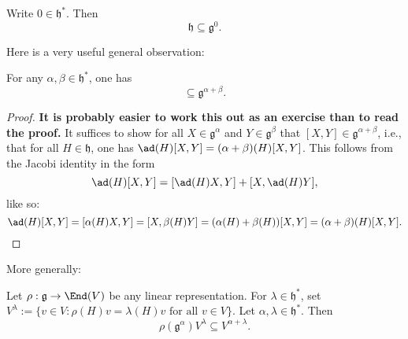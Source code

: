 \documentclass[reqno]{amsart} 
\begin{document}
\begin{exercise}
  Write $0 \in \mathfrak{h}^*$.  Then
  \begin{equation*}
    \mathfrak{h} \subseteq \mathfrak{g}^0.
  \end{equation*}
\end{exercise}

Here is a very useful general observation:
\begin{lemma}\label{lem:commutators-of-root-spaces}
  For any $\alpha,\beta \in \mathfrak{h}^*$, one has
  \begin{equation*}
 [\mathfrak{g}^\alpha, \mathfrak{g}^\beta] \subseteq \mathfrak{g}^{\alpha + \beta}.
  \end{equation*}
\end{lemma}
\begin{proof}
 { \bf It is probably easier to work this out as an exercise than to read the proof.  }
  It suffices to show for all $X \in \mathfrak{g}^\alpha$ and $Y \in \mathfrak{g}^\beta$ that $[X,Y] \in \mathfrak{g}^{\alpha + \beta}$, i.e., that for all $H \in \mathfrak{h}$, one has $\ad(H)[X,Y] = (\alpha + \beta)(H) [X,Y]$.  This follows from the Jacobi identity in the form
  \begin{equation}
    \ad(H) [X,Y] = [\ad(H) X, Y] + [X,\ad(H) Y],
  \end{equation}
  like so:
  \begin{equation}
    \ad(H)[X,Y] = [\alpha(H) X, Y] = [X,\beta(H) Y]
    = (\alpha(H) + \beta(H))[X,Y]
    = (\alpha + \beta)(H)[X,Y].
  \end{equation}
\end{proof}
More generally:
\begin{lemma}\label{lem:general-commutation-root-spaces-on-weight-spaces}
  Let $\rho : \mathfrak{g} \rightarrow \End(V)$ be any linear representation.  For $\lambda \in \mathfrak{h}^*$, set $V^\lambda := \{v \in V : \rho(H) v = \lambda(H) v \text{ for all } v \in V\}$.  Let $\alpha, \lambda \in \mathfrak{h}^*$.  Then
  \begin{equation*}
    \rho(\mathfrak{g}^\alpha) V^\lambda \subseteq V^{\alpha + \lambda}.
  \end{equation*}
\end{lemma}
\end{document}

